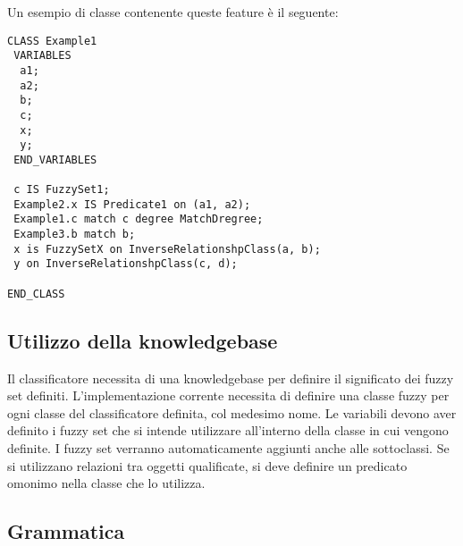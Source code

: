 Un esempio di classe contenente queste feature è il seguente:

\begin{verbatim}
CLASS Example1
 VARIABLES
  a1;
  a2;
  b;
  c;
  x;
  y;
 END_VARIABLES
 
 c IS FuzzySet1;
 Example2.x IS Predicate1 on (a1, a2);
 Example1.c match c degree MatchDregree;
 Example3.b match b;
 x is FuzzySetX on InverseRelationshpClass(a, b);
 y on InverseRelationshpClass(c, d);
 
END_CLASS
\end{verbatim}

\subsection{Utilizzo della knowledgebase}
Il classificatore necessita di una knowledgebase per definire il significato dei fuzzy set definiti. 
L'implementazione corrente necessita di definire una classe fuzzy per ogni classe del classificatore definita, col medesimo nome.
Le variabili devono aver definito i fuzzy set che si intende utilizzare all'interno della classe in cui vengono definite. I fuzzy set verranno automaticamente aggiunti anche alle sottoclassi.
Se si utilizzano relazioni tra oggetti qualificate, si deve definire un predicato omonimo nella classe che lo utilizza.

\subsection{Grammatica}

